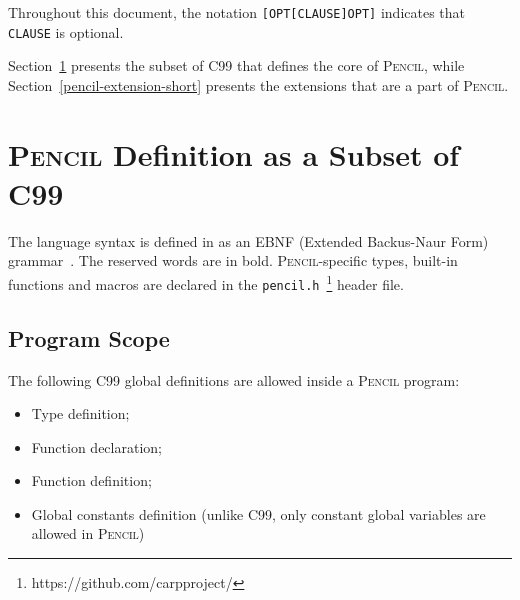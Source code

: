 \documentclass{carp}
\newcommand\pencil{\textsc{Pencil}\xspace}
\newcommand{\C}{C99\xspace}
\begin{document}
Throughout this document, the notation \lstinline![OPT[CLAUSE]OPT]! indicates
that \lstinline!CLAUSE! is optional.

Section~\ref{pencil-c99-subset} presents the subset of C99 that
defines the core of \pencil, while Section~\ref{pencil-extension-short}
presents the extensions that are a part of \pencil.

\section{\pencil Definition as a Subset of C99}
\label{pencil-c99-subset}
The language syntax is defined in  as an EBNF (Extended
Backus-Naur Form) grammar~\cite{wirth1996EBNF}.
The reserved words are in bold.
\pencil-specific types, built-in functions and macros are declared in
the \texttt{pencil.h}~\footnote{https://github.com/carpproject/}
header file.



\subsection{Program Scope}
The following \C global definitions are allowed inside a \pencil program:
\begin{itemize}
  \item Type definition;
  \item Function declaration;
  \item Function definition;
  \item Global constants definition (unlike \C, only constant global variables
        are allowed in \pencil)
\end{itemize}
\end{document}
